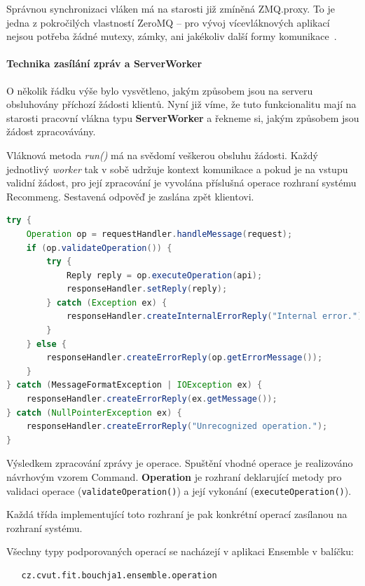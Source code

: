 \documentclass[thesis=M,czech]{FITthesis}[2014/05/07]
\begin{document}
Správnou synchronizaci vláken má na starosti již zmíněná ZMQ.proxy. To je jedna z pokročilých vlastností ZeroMQ – pro vývoj vícevláknových aplikací nejsou potřeba žádné mutexy, zámky, ani jakékoliv další formy komunikace~\cite{mtserver}.

\paragraph{Technika zasílání zpráv a ServerWorker}
\label{serverworker}
O několik řádku výše bylo vysvětleno, jakým způsobem jsou na serveru obsluhovány příchozí žádosti klientů. Nyní již víme, že tuto funkcionalitu mají na starosti pracovní vlákna typu \textbf{ServerWorker} a řekneme si, jakým způsobem jsou žádost zpracovávány.

Vláknová metoda \emph{run()} má na svědomí veškerou obsluhu žádosti. Každý jednotlivý \emph{worker} tak v sobě udržuje kontext komunikace a pokud je na vstupu validní žádost, pro její zpracování je vyvolána příslušná operace rozhraní systému Recommeng. Sestavená odpověď je zaslána zpět klientovi.

\begin{lstlisting}[language=java]
try {
    Operation op = requestHandler.handleMessage(request);
    if (op.validateOperation()) {
        try {
            Reply reply = op.executeOperation(api);
            responseHandler.setReply(reply);
        } catch (Exception ex) {
            responseHandler.createInternalErrorReply("Internal error.");
        }
    } else {
        responseHandler.createErrorReply(op.getErrorMessage());
    }
} catch (MessageFormatException | IOException ex) {
    responseHandler.createErrorReply(ex.getMessage());
} catch (NullPointerException ex) {
    responseHandler.createErrorReply("Unrecognized operation.");
}
\end{lstlisting}

Výsledkem zpracování zprávy je operace. Spuštění vhodné operace je realizováno návrhovým vzorem Command. \textbf{Operation} je rozhraní deklarující metody pro validaci operace (\texttt{validateOperation()}) a její vykonání (\texttt{executeOperation()}).

Každá třída implementující toto rozhraní je pak konkrétní operací zasílanou na rozhraní systému. 

Všechny typy podporovaných operací se nacházejí v aplikaci Ensemble v balíčku:

\begin{verbatim}
   cz.cvut.fit.bouchja1.ensemble.operation
\end{verbatim}
\end{document}

